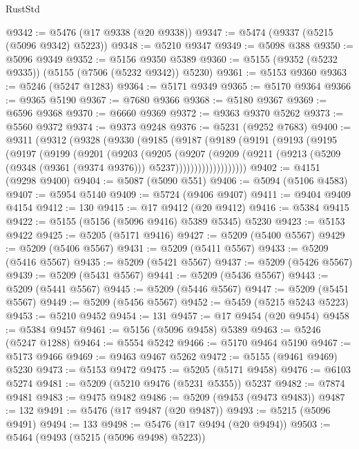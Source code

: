 \begin{lexlean}{RustStd}
\begin{coremodule}
@9342 := @5476 (@17 @9338 (@20 @9338))
@9347 := @5474 (@9337 (@5215 (@5096 @9342) @5223))
@9348 := @5210 @9347
@9349 := @5098 @388
@9350 := @5096 @9349
@9352 := @5156 @9350 @5389
@9360 := @5155 (@9352 (@5232 @9335)) (@5155 (@7506 (@5232 @9342)) @5230)
@9361 := @5153 @9360
@9363 := @5246 (@5247 @1283)
@9364 := @5171 @9349
@9365 := @5170 @9364
@9366 := @9365 @5190
@9367 := @7680 @9366
@9368 := @5180 @9367
@9369 := @6596 @9368
@9370 := @6660 @9369
@9372 := @9363 @9370 @5262
@9373 := @5560 @9372
@9374 := @9373 @9248
@9376 := @5231 (@9252 @7683)
@9400 := @9311
    (@9312
      (@9328
        (@9330
          (@9185
            (@9187
              (@9189
                (@9191
                  (@9193
                    (@9195
                      (@9197
                        (@9199
                          (@9201
                            (@9203
                              (@9205
                                (@9207
                                  (@9209
                                    (@9211
                                      (@9213
                                        (@5209
                                          (@9348 (@9361 (@9374 @9376)))
                                          @5237)))))))))))))))))))
@9402 := @4151 (@9298 @9400)
@9404 := @5087 (@5090 @551)
@9406 := @5094 (@5106 @4583)
@9407 := @5954 @5140
@9409 := @5724 (@9406 @9407)
@9411 := @9404 @9409 @4154
@9412 := 130
@9415 := @17 @9412 (@20 @9412)
@9416 := @5384 @9415
@9422 := @5155 (@5156 (@5096 @9416) @5389 @5345) @5230
@9423 := @5153 @9422
@9425 := @5205 (@5171 @9416)
@9427 := @5209 (@5400 @5567)
@9429 := @5209 (@5406 @5567)
@9431 := @5209 (@5411 @5567)
@9433 := @5209 (@5416 @5567)
@9435 := @5209 (@5421 @5567)
@9437 := @5209 (@5426 @5567)
@9439 := @5209 (@5431 @5567)
@9441 := @5209 (@5436 @5567)
@9443 := @5209 (@5441 @5567)
@9445 := @5209 (@5446 @5567)
@9447 := @5209 (@5451 @5567)
@9449 := @5209 (@5456 @5567)
@9452 := @5459 (@5215 @5243 @5223)
@9453 := @5210 @9452
@9454 := 131
@9457 := @17 @9454 (@20 @9454)
@9458 := @5384 @9457
@9461 := @5156 (@5096 @9458) @5389
@9463 := @5246 (@5247 @1288)
@9464 := @5554 @5242
@9466 := @5170 @9464 @5190
@9467 := @5173 @9466
@9469 := @9463 @9467 @5262
@9472 := @5155 (@9461 @9469) @5230
@9473 := @5153 @9472
@9475 := @5205 (@5171 @9458)
@9476 := @6103 @5274
@9481 := @5209 (@5210 @9476 (@5231 @5355)) @5237
@9482 := @7874 @9481
@9483 := @9475 @9482
@9486 := @5209 (@9453 (@9473 @9483))
@9487 := 132
@9491 := @5476 (@17 @9487 (@20 @9487))
@9493 := @5215 (@5096 @9491)
@9494 := 133
@9498 := @5476 (@17 @9494 (@20 @9494))
@9503 := @5464 (@9493 (@5215 (@5096 @9498) @5223))

\end{coremodule}
\end{lexlean}
